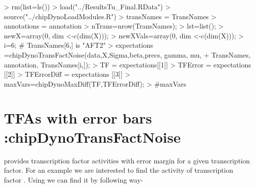 \documentclass[11pt, a4paper, oneside]{article}
\begin{document}
\begin{Schunk}
\begin{Sinput}
> rm(list=ls())
> load("../ResultsTu_Final.RData")
> source("../chipDynoLoadModules.R")
> transNames = TransNames
> annotations = annotation
> nTrans=nrow(TransNames);
> lst=list();
> newX=array(0, dim <-c(dim(X)));
> newXVals=array(0, dim <-c(dim(X)));
> i=6; # TransNames[6,] is "AFT2"
> expectations =chipDynoTransFactNoise(data,X,Sigma,beta,precs, gamma, mu, 
+   					TransNames, annotation, TransNames[i,]);
> TF = expectations[[1]]
> TFError = expectations [[2]]
> TFErrorDiff = expectations [[3]]
> maxVars=chipDynoMaxDiff(TF,TFErrorDiff);
> #maxVars
\end{Sinput}
\end{Schunk}


\section{TFAs with error bars :chipDynoTransFactNoise}
 provides transcription factor activities with error margin for a given transcription factor. For an example we are interested to find the activity of transcription factor . Using  we can find it by following way-
\end{document}
